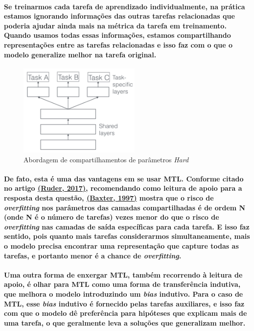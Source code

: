 \documentclass[a4paper]{article}    %
\begin{document}
\paragraph{Se treinarmos cada tarefa de aprendizado individualmente, na prática estamos ignorando informações das outras tarefas relacionadas que poderia ajudar ainda mais na métrica da tarefa em treinamento. Quando usamos todas essas informações, estamos compartilhando representações entre as tarefas relacionadas e isso faz com o que o modelo generalize melhor na tarefa original.}

\begin{figure}[H]
    \centering
    \includegraphics[width=6cm]{Q7}
    \caption{Abordagem de compartilhamentos de parâmetros \emph{Hard}}
    \label{fig:q7}
\end{figure}

\paragraph{De fato, esta é uma das vantagens em se usar MTL. Conforme citado no artigo \href{https://arxiv.org/pdf/1706.05098.pdf}{(Ruder, 2017)}, recomendando como leitura de apoio para a resposta desta questão, \href{https://link.springer.com/content/pdf/10.1023/A:1007327622663.pdf}{(Baxter, 1997)} mostra que o risco de \emph{overfitting} nos parâmetros das camadas compartilhadas é de ordem N (onde N é o número de tarefas) vezes menor do que o risco de \emph{overfitting } nas camadas de saída específicas para cada tarefa. E isso faz sentido, pois quanto mais tarefas considerarmos simultaneamente, mais o modelo precisa encontrar uma representação que capture todas as tarefas, e portanto menor é a chance de \emph{overfitting}.}

\paragraph{Uma outra forma de enxergar MTL, também recorrendo à leitura de apoio, é olhar para MTL como uma forma de transferência indutiva, que melhora o modelo introduzindo um \emph{bias} indutivo. Para o caso de MTL, esse \emph{bias} indutivo é fornecido pelas tarefas auxiliares, e isso faz com que o modelo dê preferência para hipóteses que explicam mais de uma tarefa, o que geralmente leva a soluções que generalizam melhor.}
\end{document}

